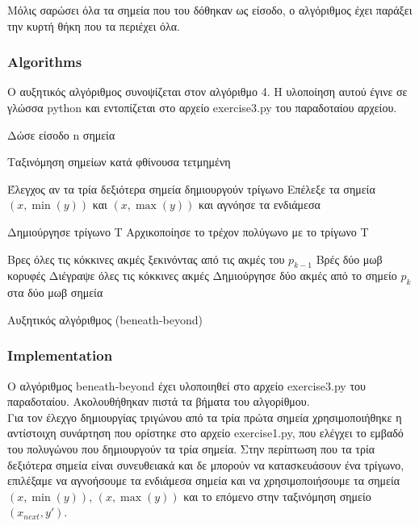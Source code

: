 \documentclass[12pt]{article}
\begin{document}
Μόλις σαρώσει όλα τα σημεία που του δόθηκαν ως είσοδο, ο αλγόριθμος έχει παράξει την κυρτή θήκη που τα περιέχει όλα. \\

\subsubsection*{Algorithms}

Ο αυξητικός αλγόριθμος συνοψίζεται στον αλγόριθμο 4. Η υλοποίηση αυτού έγινε σε γλώσσα python και εντοπίζεται στο αρχείο exercise3.py του παραδοταίου αρχείου.

\begin{algorithm}[H]
	\SetAlgoLined
	
	Δώσε είσοδο n σημεία \;
	
	Ταξινόμηση σημείων κατά φθίνουσα τετμημένη \;
	
	Έλεγχος αν τα τρία δεξιότερα σημεία δημιουργούν τρίγωνο \;
	{Επέλεξε τα σημεία \((x, \min(y))\) και \((x, \max(y))\) και αγνόησε τα ενδιάμεσα\;}
	
	Δημιούργησε τρίγωνο Τ \; 
	Αρχικοποίησε το τρέχον πολύγωνο με το τρίγωνο Τ \;
	
	{Βρες όλες τις κόκκινες ακμές ξεκινόντας από τις ακμές του \(p_{k-1}\) \;
	Βρές δύο μωβ κορυφές \;
	Διέγραψε όλες τις κόκκινες ακμές \;
	Δημιούργησε δύο ακμές από το σημείο \(p_k\) στα δύο μωβ σημεία \;
	}
	
	\caption{Αυξητικός αλγόριθμος (beneath-beyond)}
\end{algorithm}

\subsubsection*{Implementation}

Ο αλγόριθμος beneath-beyond έχει υλοποιηθεί στο αρχείο exercise3.py του παραδοταίου. Ακολουθήθηκαν πιστά τα βήματα του αλγορίθμου. \\

Για τον έλεχγο δημιουργίας τριγώνου από τα τρία πρώτα σημεία χρησιμοποιήθηκε η αντίστοιχη συνάρτηση που ορίστηκε στο αρχείο exercise1.py, που ελέγχει το εμβαδό του πολυγώνου που δημιουργούν τα τρία σημεία. Στην περίπτωση που τα τρία δεξιότερα σημεία είναι συνευθειακά και δε μπορούν να κατασκευάσουν ένα τρίγωνο, επιλέξαμε να αγνοήσουμε τα ενδιάμεσα σημεία και να χρησιμοποιήσουμε τα σημεία \((x, \min(y))\), \((x, \max(y))\) και το επόμενο στην ταξινόμηση σημείο \((x_{next}, y')\). \\
\end{document}
